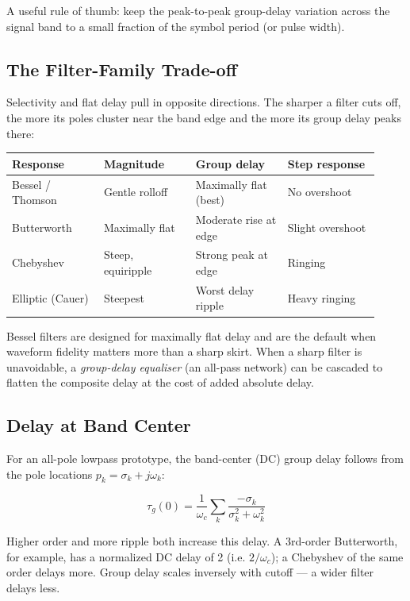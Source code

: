       

A useful rule of thumb: keep the peak-to-peak group-delay variation across the signal band to a small fraction of the symbol period (or pulse width).

      

\subsection{The Filter-Family Trade-off}

      

Selectivity and flat delay pull in opposite directions. The sharper a filter cuts off, the more its poles cluster near the band edge and the more its group delay peaks there:

      
        
        
        
        
        
      

{\small\begin{longtable}{>{\raggedright\arraybackslash}p{0.230\linewidth}>{\raggedright\arraybackslash}p{0.230\linewidth}>{\raggedright\arraybackslash}p{0.230\linewidth}>{\raggedright\arraybackslash}p{0.230\linewidth}}
\hline
\textbf{Response} & \textbf{Magnitude} & \textbf{Group delay} & \textbf{Step response} \\
\hline
Bessel / Thomson & Gentle rolloff & Maximally flat (best) & No overshoot \\
Butterworth & Maximally flat & Moderate rise at edge & Slight overshoot \\
Chebyshev & Steep, equiripple & Strong peak at edge & Ringing \\
Elliptic (Cauer) & Steepest & Worst delay ripple & Heavy ringing \\
\hline
\end{longtable}}

      

Bessel filters are designed for maximally flat delay and are the default when waveform fidelity matters more than a sharp skirt. When a sharp filter is unavoidable, a \emph{group-delay equaliser} (an all-pass network) can be cascaded to flatten the composite delay at the cost of added absolute delay.

      

\subsection{Delay at Band Center}

      

For an all-pole lowpass prototype, the band-center (DC) group delay follows from the pole locations $p_k=\sigma_k+j\omega_k$:

      
\[\tau_g(0) = \dfrac{1}{\omega_c}\sum_k \dfrac{-\sigma_k}{\sigma_k^2+\omega_k^2}\]

      

Higher order and more ripple both increase this delay. A 3rd-order Butterworth, for example, has a normalized DC delay of 2 (i.e. $2/\omega_c$); a Chebyshev of the same order delays more. Group delay scales inversely with cutoff — a wider filter delays less.



